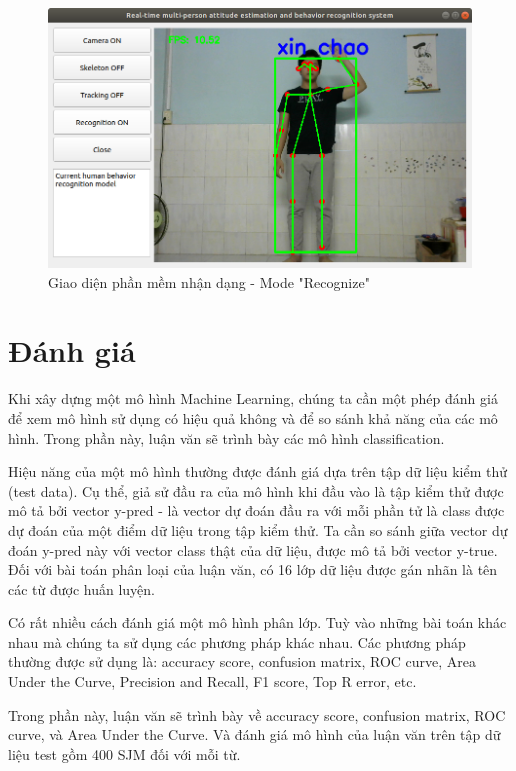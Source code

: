 \FloatBarrier
\begin{figure}[htp]
\begin{center}
\includegraphics[scale=0.5]{chap6/c6_figs/mode_recognize.png}
\end{center}
\caption{Giao diện phần mềm nhận dạng - Mode "Recognize"}
\label{fig:gui3}
\end{figure}
\FloatBarrier

\section{Đánh giá}
Khi xây dựng một mô hình Machine Learning, chúng ta cần một phép đánh giá để xem mô hình sử dụng có hiệu quả không và để so sánh khả năng của các mô hình. Trong phần này, luận văn sẽ trình bày các mô hình classification.

Hiệu năng của một mô hình thường được đánh giá dựa trên tập dữ liệu kiểm thử (test data). Cụ thể, giả sử đầu ra của mô hình khi đầu vào là tập kiểm thử được mô tả bởi vector y-pred - là vector dự đoán đầu ra với mỗi phần tử là class được dự đoán của một điểm dữ liệu trong tập kiểm thử. Ta cần so sánh giữa vector dự đoán y-pred này với vector class thật của dữ liệu, được mô tả bởi vector y-true. Đối với bài toán phân loại của luận văn, có 16 lớp dữ liệu được gán nhãn là tên các từ được huấn luyện.


Có rất nhiều cách đánh giá một mô hình phân lớp. Tuỳ vào những bài toán khác nhau mà chúng ta sử dụng các phương pháp khác nhau. Các phương pháp thường được sử dụng là: accuracy score, confusion matrix, ROC curve, Area Under the Curve, Precision and Recall, F1 score, Top R error, etc.

Trong phần này, luận văn sẽ trình bày về accuracy score, confusion matrix, ROC curve, và Area Under the Curve. Và đánh giá mô hình của luận văn trên tập dữ liệu test gồm 400 SJM đối với mỗi từ.

